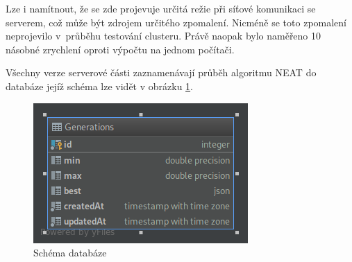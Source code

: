 Lze i namítnout, že se zde projevuje určitá režie při síťové komunikaci se serverem, což může být zdrojem určitého zpomalení. Nicméně se toto zpomalení neprojevilo v~průběhu testování clusteru. Právě naopak bylo naměřeno 10 násobné zrychlení oproti výpočtu na jednom počítači.

Všechny verze serverové části zaznamenávají průběh algoritmu NEAT do databáze jejíž schéma lze vidět v obrázku \ref{fig:database}. 
\begin{figure}
	\centering
	\includegraphics[width=0.7\linewidth]{database}
	\caption{Schéma databáze}
	\label{fig:database}
\end{figure}

